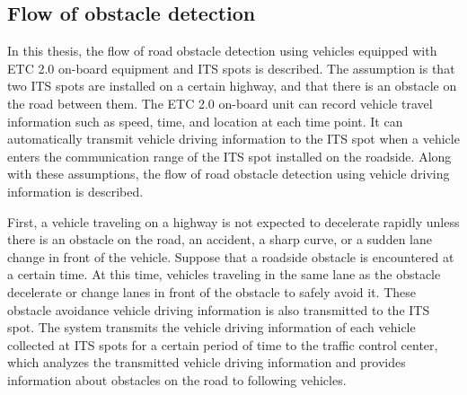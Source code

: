 \documentclass[paper]{ieice}
\begin{document}
\subsection{Flow of obstacle detection}
\label{sec:flow_of_obstacle_detection}
%
In this thesis, the flow of road obstacle detection using vehicles equipped with ETC 2.0 on-board equipment and ITS spots is described.
%
The assumption is that two ITS spots are installed on a certain highway, and that there is an obstacle on the road between them.
%
The ETC 2.0 on-board unit can record vehicle travel information such as speed, time, and location at each time point.
%
It can automatically transmit vehicle driving information to the ITS spot when a vehicle enters the communication range of the ITS spot installed on the roadside.
%
Along with these assumptions, the flow of road obstacle detection using vehicle driving information is described.
%
\par
%
First, a vehicle traveling on a highway is not expected to decelerate rapidly unless there is an obstacle on the road, an accident, a sharp curve, or a sudden lane change in front of the vehicle.
%
Suppose that a roadside obstacle is encountered at a certain time.
%
At this time, vehicles traveling in the same lane as the obstacle decelerate or change lanes in front of the obstacle to safely avoid it.
%
These obstacle avoidance vehicle driving information is also transmitted to the ITS spot.
%
The system transmits the vehicle driving information of each vehicle collected at ITS spots for a certain period of time to the traffic control center, which analyzes the transmitted vehicle driving information and provides information about obstacles on the road to following vehicles.
%
\end{document}
